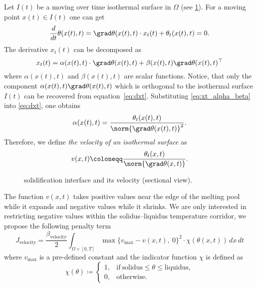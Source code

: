 Let $I(t)$ be a moving over time isothermal surface in $\Omega$ (see \cref{fig:velocity}). For a moving point $x(t) \in I(t)$ one can get
\begin{equation} \label{eq:dxt}
	\frac{d}{dt} \theta(x(t),t) = \grad \theta(x(t),t) \cdot x_t(t) + \theta_t(x(t),t) = 0.
\end{equation}
The derivative $x_t(t)$ can be decomposed as
\begin{equation} \label{eq:xt_alpha_beta}
	x_t(t) = \alpha(x(t),t) \cdot \grad \theta(x(t),t) + \beta(x(t),t) \grad \theta(x(t),t)^{\top}
\end{equation}
where $\alpha(x(t),t)$ and $\beta(x(t),t)$ are scalar functions. Notice, that only the component $\alpha(x(t),t) \grad \theta(x(t),t)$ which is orthogonal to the isothermal surface $I(t)$ can be recovered from equation~\eqref{eq:dxt}. Substituting \eqref{eq:xt_alpha_beta} into \eqref{eq:dxt}, one obtains
\begin{equation}
	\alpha(x(t),t) = \frac{\theta_t(x(t),t)}{\norm{\grad \theta(x(t),t)}^2}.
\end{equation}
Therefore, we define \emph{the velocity of an isothermal surface} as
\begin{equation}
	v(x,t) \coloneqq \frac{\theta_t(x,t)}{\norm{\grad \theta(x,t)}}.
\end{equation}


\begin{figure}
	\centering
	
	\caption{ solidification interface and its velocity (sectional view).}
	\label{fig:velocity}
\end{figure}

The function $v(x,t)$ takes positive values near the edge of the melting pool while it expands and negative values while it shrinks. We are only interested in restricting negative values within the solidus--liquidus temperature corridor, we propose the following penalty term
\begin{equation}
	J_{\text{velocity}} = \frac{\beta_\text{velocity}}{2}
	\int_{\Omega \times [0,T]} \max \{ v_{\max} - v(x,t),\ 0 \}^2 \cdot \chi(\theta(x,t))\, dx\,dt
\end{equation}where $v_{\max}$ is a pre-defined constant and the indicator function $\chi$ is defined as
\begin{equation}
	\chi(\theta) \coloneqq \left\{
		\begin{array}{ll}
			1, & \text{if}\ \text{solidus} \le \theta \le \text{liquidus}, \\
			0, & \text{otherwise}.
		\end{array} \right.
\end{equation}



